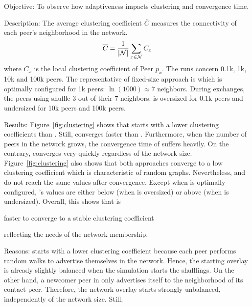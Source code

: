 \begin{asparadesc}
\item[Objective:] To observe how adaptiveness impacts clustering and convergence
  time.
\item[Description:] The average clustering coefficient $\overline{C}$ measures
  the connectivity of each peer's neighborhood in the network.
  \begin{equation}
    \overline{C} = {1\over |\mathcal{N}|}\sum\limits_{x\in\mathcal{N}}C_x
  \end{equation}
  where $C_x$ is the local clustering coefficient of Peer $p_x$.  The runs
  concern 0.1k, 1k, 10k and 100k peers. The representative of fixed-size
  approach is \CYCLON which is optimally configured for 1k peers:
  $\ln(1000)\approx 7$ neighbors. During exchanges, the peers using \CYCLON
  shuffle $3$ out of their $7$ neighbors. \CYCLON is oversized for 0.1k peers
  and undersized for 10k peers and 100k peers.
\item[Results:] Figure~\ref{fig:clustering} shows that \CYCLON starts
  with a lower clustering coefficients than \SPRAY. Still, \SPRAY
  converges faster than \CYCLON. Furthermore, when the number of peers
  in the network grows, the convergence time of \CYCLON suffers
  heavily. On the contrary, \SPRAY converges very quickly
  regardless of the network size. Figure~\ref{fig:clustering} also
  shows that both approaches converge to a low clustering coefficient
  which is characteristic of random graphs. Nevertheless, \CYCLON and
  \SPRAY do not reach the same values after convergence. Except when
  \CYCLON is optimally configured, \SPRAY's values are either below
  (when \CYCLON is oversized) or above (when \CYCLON is undersized).
  Overall, this shows that \SPRAY is
  \begin{inparaenum}
  \item faster to converge to a stable clustering coefficient
  \item reflecting the needs of the network membership.
  \end{inparaenum}
\item[Reasons:] \CYCLON starts with a lower clustering coefficient because each
  peer performs random walks to advertise themselves in the network. Hence, the
  starting overlay is already slightly balanced when the simulation starts the
  shufflings. On the other hand, a newcomer peer in \SPRAY only advertises
  itself to the neighborhood of its contact peer. Therefore, the network overlay
  starts strongly unbalanced, independently of the network size. Still, \CYCLON

\end{asparadesc}
